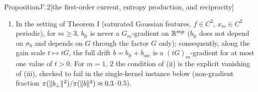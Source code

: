 \begin{thm}{Proposition}{J$'$.2}[the first-order current, entropy production, and reciprocity]
\begin{enumerate}[label=\textup{(\roman*)}]
    $H = -G_m\nabla\mathcal{J}$, $\langle\mathcal{J}\rangle = J_m$), $\mathcal{U}$ its zero-mean antiderivative in
    $\theta$, and $[X,Y]_G := XGY - YGX$. The first term is the finite-$m$ form of the reciprocity defect of
    Theorem I; the second is the failure of the instantaneous Hessians at different phases to commute, the
    non-gradient part of second-order averaging of a time-periodic gradient flow.
  \item In the setting of Theorem I (saturated Gaussian features, $f\in C^2$, $x_m\in C^2$ periodic), for $m\ge3$,
    $b_{\mathrm{fr}}$ is never a $G_m$-gradient on $\mathbb{R}^{mp}$ ($b_{\mathrm{fr}}$ does not depend on $\sigma_0$ and
    depends on $G$ through the factor $G$ only); consequently, along the gain scale $t\mapsto tG$, the full drift
    $b = b_{\mathrm{fr}} + b_{\mathrm{osc}}$ is a $(tG)_m$-gradient for at most one value of $t > 0$. For $m = 1$, $2$
    the condition of \textup{(ii)} is the explicit vanishing of \textup{(iii)}, checked to fail in the single-kernel
    instance below (non-gradient fraction $\pi(\lVert b_\perp\rVert^2)/\pi(\lVert b\rVert^2)\approx0.3$--$0.5$).
\end{enumerate}
\end{thm}

